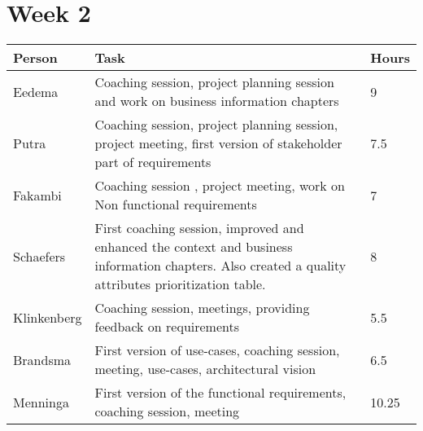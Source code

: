 \section{Week 2}
\begin{tabular}{L{0.2\textwidth} L{0.7\textwidth} L{0.1\textwidth}}
	\textbf{Person} & \textbf{Task}                                                                                                                                        & \textbf{Hours} \\ \toprule
	Eedema          & Coaching session, project planning session and work on business information chapters                                                                 & 9              \\ \midrule
	Putra           & Coaching session, project planning session, project meeting, first version of stakeholder part of requirements                                       & 7.5            \\ \midrule
	Fakambi         & Coaching session , project meeting, work on Non functional requirements                                                                              & 7              \\ \midrule
	Schaefers       & First coaching session, improved and enhanced the context and business information chapters. Also created a quality attributes prioritization table. & 8              \\ \midrule
	Klinkenberg     & Coaching session, meetings, providing feedback on requirements                                                                                       & 5.5            \\ \midrule
	Brandsma        & First version of use-cases, coaching session, meeting, use-cases, architectural vision                                                               & 6.5            \\ \midrule
	Menninga        & First version of the functional requirements, coaching session, meeting                                                                              & 10.25          \\ \bottomrule
\end{tabular}

